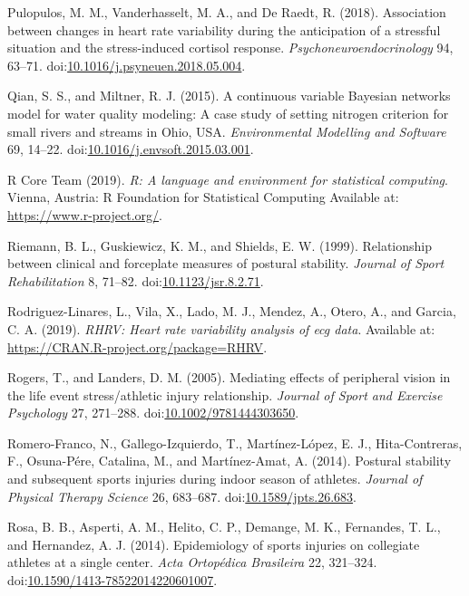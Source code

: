 \documentclass[
  english,
  man]{apa6}
\newlength{\cslhangindent}
\newenvironment{cslreferences}%
  {\setlength{\parindent}{0pt}%
  \everypar{\setlength{\hangindent}{\cslhangindent}}\ignorespaces}%
  {\par}
\begin{document}
\begin{cslreferences}
\leavevmode\hypertarget{ref-Pulopulos2018}{}%
Pulopulos, M. M., Vanderhasselt, M. A., and De Raedt, R. (2018). Association between changes in heart rate variability during the anticipation of a stressful situation and the stress-induced cortisol response. \emph{Psychoneuroendocrinology} 94, 63--71. doi:\href{https://doi.org/10.1016/j.psyneuen.2018.05.004}{10.1016/j.psyneuen.2018.05.004}.

\leavevmode\hypertarget{ref-Qian2015}{}%
Qian, S. S., and Miltner, R. J. (2015). A continuous variable Bayesian networks model for water quality modeling: A case study of setting nitrogen criterion for small rivers and streams in Ohio, USA. \emph{Environmental Modelling and Software} 69, 14--22. doi:\href{https://doi.org/10.1016/j.envsoft.2015.03.001}{10.1016/j.envsoft.2015.03.001}.

\leavevmode\hypertarget{ref-RCoreTeam2019}{}%
R Core Team (2019). \emph{R: A language and environment for statistical computing}. Vienna, Austria: R Foundation for Statistical Computing Available at: \url{https://www.r-project.org/}.

\leavevmode\hypertarget{ref-Riemann1999d}{}%
Riemann, B. L., Guskiewicz, K. M., and Shields, E. W. (1999). Relationship between clinical and forceplate measures of postural stability. \emph{Journal of Sport Rehabilitation} 8, 71--82. doi:\href{https://doi.org/10.1123/jsr.8.2.71}{10.1123/jsr.8.2.71}.

\leavevmode\hypertarget{ref-Rodriguez-Linares2017}{}%
Rodriguez-Linares, L., Vila, X., Lado, M. J., Mendez, A., Otero, A., and Garcia, C. A. (2019). \emph{RHRV: Heart rate variability analysis of ecg data}. Available at: \url{https://CRAN.R-project.org/package=RHRV}.

\leavevmode\hypertarget{ref-Rogers2005}{}%
Rogers, T., and Landers, D. M. (2005). Mediating effects of peripheral vision in the life event stress/athletic injury relationship. \emph{Journal of Sport and Exercise Psychology} 27, 271--288. doi:\href{https://doi.org/10.1002/9781444303650}{10.1002/9781444303650}.

\leavevmode\hypertarget{ref-Romero-Franco2014}{}%
Romero-Franco, N., Gallego-Izquierdo, T., Martínez-López, E. J., Hita-Contreras, F., Osuna-Pére, Catalina, M., and Martínez-Amat, A. (2014). Postural stability and subsequent sports injuries during indoor season of athletes. \emph{Journal of Physical Therapy Science} 26, 683--687. doi:\href{https://doi.org/10.1589/jpts.26.683}{10.1589/jpts.26.683}.

\leavevmode\hypertarget{ref-Rosa2014}{}%
Rosa, B. B., Asperti, A. M., Helito, C. P., Demange, M. K., Fernandes, T. L., and Hernandez, A. J. (2014). Epidemiology of sports injuries on collegiate athletes at a single center. \emph{Acta Ortopédica Brasileira} 22, 321--324. doi:\href{https://doi.org/10.1590/1413-78522014220601007}{10.1590/1413-78522014220601007}.


\end{cslreferences}
\end{document}
